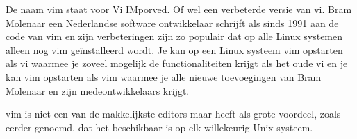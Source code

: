 De naam vim staat voor Vi IMporved. Of wel een verbeterde versie van vi. Bram Molenaar een Nederlandse software ontwikkelaar schrijft als sinds 1991 aan de code van vim en zijn verbeteringen zijn zo populair dat op alle Linux systemen alleen nog vim ge\"installeerd wordt. Je kan op een Linux systeem vim opstarten als vi waarmee je zoveel mogelijk de functionaliteiten krijgt als het oude vi en je kan vim opstarten als vim waarmee je alle nieuwe toevoegingen van Bram Molenaar en zijn medeontwikkelaars krijgt.

vim is niet een van de makkelijkste editors maar heeft als grote voordeel, zoals eerder genoemd, dat het beschikbaar is op elk willekeurig Unix systeem.
